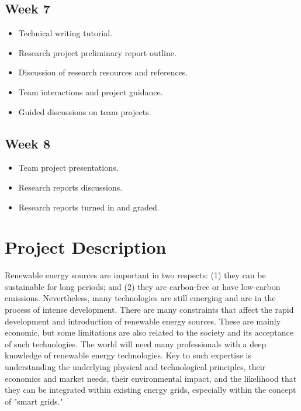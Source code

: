 \documentclass[11pt]{article}
\begin{document}
\subsection*{Week 7}
\begin{itemize}
    \item Technical writing tutorial.
    \item Research project preliminary report outline.
    \item Discussion of research resources and references.
    \item Team interactions and project guidance.
   \item Guided discussions on team projects.
\end{itemize}
\subsection*{Week 8}
\begin{itemize}
    \item Team project presentations.
    \item Research reports discussions.
    \item Research reports turned in and graded.
\end{itemize}
\newpage
\section{Project Description}

Renewable energy sources are important in two respects: (1) they can be sustainable for long periods; and (2) they are carbon-free or have low-carbon emissions.  Nevertheless, many technologies are still emerging and are in the process of intense development. There are many constraints that affect the rapid development and introduction of renewable energy sources. These are mainly economic, but some limitations are also related to the society and its acceptance of such technologies. The world will need many
professionals with a deep knowledge of renewable energy technologies.  Key to such expertise is understanding the 
underlying physical and technological principles, their economics and market needs, their environmental impact, and the likelihood that they can be integrated within existing energy grids, especially within the concept of "smart grids."
\end{document}
